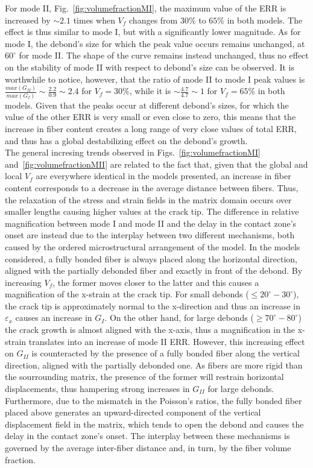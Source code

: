 \documentclass[review]{elsarticle}
\begin{document}
For mode II, Fig.~\ref{fig:volumefractionMI}, the maximum value of the ERR is increased by $\sim 2.1$ times when $V_{f}$ changes from $30\%$ to $65\%$ in both models. The effect is thus similar to mode I, but with a significantly lower magnitude. As for mode I, the debond's size for which the peak value occurs remains unchanged, at $60^{\circ}$ for mode II. The shape of the curve remains instead unchanged, thus no effect on the stability of mode II with respect to debond's size can be observed. It is worthwhile to notice, however, that the ratio of mode II to mode I peak values is $\frac{max\left(G_{II}\right)}{max\left(G_{I}\right)}\sim\frac{2.2}{0.9}\sim 2.4$ for $V_{f}=30\%$, while it is $\sim\frac{4.7}{4.7}\sim 1$ for $V_{f}=65\%$ in both models. Given that the peaks occur at different debond's sizes, for which the value of the other ERR is very small or even close to zero, this means that the increase in fiber content creates a long range of very close values of total ERR, and thus has a global destabilizing effect on the debond's growth.\\
The general incresing trends observed in Figs.~\ref{fig:volumefractionMI} and~\ref{fig:volumefractionMII} are related to the fact that, given that the global and local $V_{f}$ are everywhere identical in the models presented, an increase in fiber content corresponds to a decrease in the average distance between fibers. Thus, the relaxation of the stress and strain fields in the matrix domain occurs over smaller lengths causing higher values at the crack tip. The difference in relative magnification between mode I and mode II and the delay in the contact zone's onset are instead due to the interplay between two different mechanisms, both caused by the ordered microstructural arrangement of the model. In the models considered, a fully bonded fiber is always placed along the horizontal direction, aligned with the partially debonded fiber and exactly in front of the debond. By increasing $V_{f}$, the former moves closer to the latter and this causes a magnification of the x-strain at the crack tip. For small debonds ($\leq 20^{\circ}-30^{\circ}$), the crack tip is approximately normal to the x-direction and thus an increase in $\varepsilon_{x}$ causes an increase in $G_{I}$. On the other hand, for large debonds ($\geq 70^{\circ}-80^{\circ}$) the crack growth is almost aligned with the x-axis, thus a magnification in the x-strain translates into an increase of mode II ERR. However, this increasing effect on $G_{II}$ is counteracted by the presence of a fully bonded fiber along the vertical direction, aligned with the partially debonded one. As fibers are more rigid than the sourrounding matrix, the presence of the former will restrain horizontal displacements, thus hampering strong increases in $G_{II}$ for large debonds. Furthermore, due to the mismatch in the Poisson's ratios, the fully bonded fiber placed above generates an upward-directed component of the vertical displacement field in the matrix, which tends to open the debond and causes the delay in the contact zone's onset. The interplay between these mechanisms is governed by the average inter-fiber distance and, in turn, by the fiber volume fraction.
\end{document}
